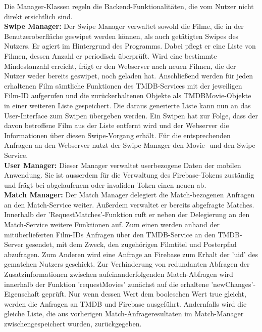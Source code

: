 Die Manager-Klassen regeln die Backend-Funktionalitäten, die vom Nutzer nicht direkt ersichtlich sind. \\

\noindent
\textbf{Swipe Manager: }
Der Swipe Manager verwaltet sowohl die Filme, die in der Benutzeroberfläche geswipet werden können, als auch getätigten Swipes des Nutzers. Er agiert im Hintergrund des Programms. Dabei pflegt er eine Liste von Filmen, dessen Anzahl er periodisch überprüft. Wird eine bestimmte Mindestanzahl erreicht, frägt er den Webserver nach neuen Filmen, die der Nutzer weder bereits geswipet, noch geladen hat. 
Anschließend werden für jeden erhaltenen Film sämtliche Funktionen des TMDB-Services mit der jeweiligen Film-ID aufgerufen und die zurückerhaltenen Objekte als TMDBMovie-Objekte in einer weiteren Liste gespeichert. Die daraus generierte Liste kann nun an das User-Interface zum Swipen übergeben werden.
Ein Swipen hat zur Folge, dass der davon betroffene Film aus der Liste entfernt wird und der Webserver die Informationen über diesen Swipe-Vorgang erhält.
Für die entsprechenden Anfragen an den Webserver nutzt der Swipe Manager den Movie- und den Swipe-Service. \\

\noindent
\textbf{User Manager:}
Dieser Manager verwaltet userbezogene Daten der mobilen Anwendung. Sie ist ausserdem für die Verwaltung des Firebase-Tokens zuständig und frägt bei abgelaufenem oder invaliden Token einen neuen ab. \\

\noindent
\textbf{Match Manager:}
Der Match Manager delegiert die Match-bezogenen Anfragen an den Match-Service weiter. Außerdem verwaltet er bereits abgefragte Matches. Innerhalb der 'RequestMatches'-Funktion ruft er neben der Delegierung an den Match-Service weitere Funktionen auf. Zum einen werden anhand der mitüberlieferten Film-IDs Anfragen über den TMDB-Service an den TMDB-Server gesendet, mit dem Zweck, den zugehörigen Filmtitel und Posterpfad abzufragen. Zum Anderen wird eine Anfrage an Firebase zum Erhalt der 'uid' des gematchen Nutzers geschickt.
Zur Verhinderung von redundanten Abfragen der Zusatzinformationen zwischen aufeinanderfolgenden Match-Abfragen wird innerhalb der Funktion 'requestMovies' zunächst auf die erhaltene 'newChanges'-Eigenschaft geprüft. Nur wenn dessen Wert dem booleschen Wert true gleicht, werden die Anfragen an TMDB und Firebase ausgeführt. Andernfalls wird die gleiche Liste, die aus vorherigen Match-Anfrageresultaten im Match-Manager zwischengespeichert wurden, zurückgegeben. \\